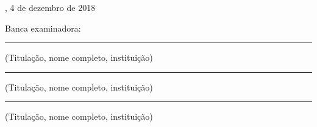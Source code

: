 
%
% 
%
\begin{folhadeaprovacao}

  \begin{center}
    {\ABNTEXchapterfont\large\imprimirautor}

    \vspace*{\fill}\vspace*{\fill}
    \begin{center}
      \ABNTEXchapterfont\bfseries\Large\imprimirtitulo
    \end{center}
    \vspace*{\fill}

    \hspace{.45\textwidth}
    \begin{minipage}{.5\textwidth}
        \imprimirpreambulo
    \end{minipage}%
    \vspace*{\fill}
  \end{center}

  \begin{center}
   \imprimirlocal, 4 de dezembro de 2018
  \end{center}

  Banca examinadora:

  \begin{center}
    \noindent\rule{16cm}{0.4pt}
    \vspace{0.1mm}
    (Titulação, nome completo, instituição)

    \vspace{5mm}

    \noindent\rule{16cm}{0.4pt}
    \vspace{0.1mm}
    (Titulação, nome completo, instituição)

    \vspace{5mm}

    \noindent\rule{16cm}{0.4pt}
    \vspace{0.1mm}
    (Titulação, nome completo, instituição)
  \end{center}

\end{folhadeaprovacao}
